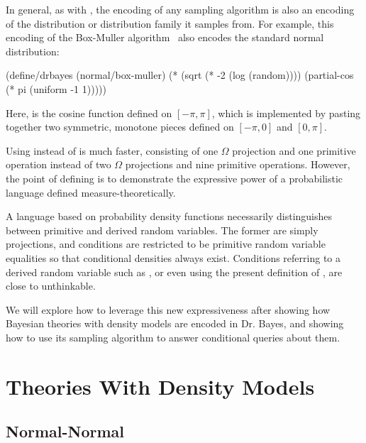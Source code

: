 In general, as with , the encoding of any sampling algorithm is also an encoding of the distribution or distribution family it samples from.
For example, this encoding of the Box-Muller algorithm~\cite{cit:box-1958-normal} also encodes the standard normal distribution:
\begin{center}\singlespacing
\begin{schemedisplay}
(define/drbayes (normal/box-muller)
  (* (sqrt (* -2 (log (random))))
     (partial-cos (* pi (uniform -1 1)))))
\end{schemedisplay}
\end{center}
Here,  is the cosine function defined on $[-\pi,\pi]$, which is implemented by pasting together two symmetric, monotone pieces defined on $[-\pi,0]$ and $[0,\pi]$.

Using  instead of  is much faster, consisting of one $\Omega$ projection and one primitive operation instead of two $\Omega$ projections and nine primitive operations.
However, the point of defining  is to demonstrate the expressive power of a probabilistic language defined measure-theoretically.

A language based on probability density functions necessarily distinguishes between primitive and derived random variables.
The former are simply projections, and conditions are restricted to be primitive random variable equalities so that conditional densities always exist.
Conditions referring to a derived random variable such as , or even  using the present definition of , are close to unthinkable.

We will explore how to leverage this new expressiveness after showing how Bayesian theories with density models are encoded in Dr. Bayes, and showing how to use its sampling algorithm to answer conditional queries about them.

\section{Theories With Density Models}

\subsection{Normal-Normal}

